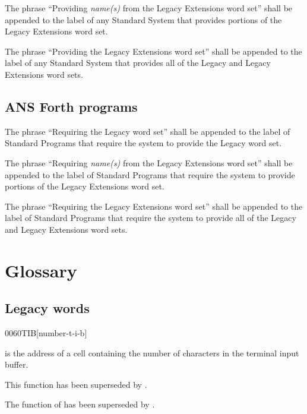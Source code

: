 The phrase ``Providing \emph{name(s)} from the Legacy Extensions
word set'' shall be appended to the label of any Standard System
that provides portions of the Legacy Extensions word set.

The phrase ``Providing the Legacy Extensions word set'' shall be
appended to the label of any Standard System that provides all of
the Legacy and Legacy Extensions word sets.

\subsection{ANS Forth programs} %

The phrase ``Requiring the Legacy word set'' shall be appended to
the label of Standard Programs that require the system to provide
the Legacy word set.

The phrase ``Requiring \emph{name(s)} from the Legacy Extensions
word set'' shall be appended to the label of Standard Programs that
require the system to provide portions of the Legacy Extensions
word set.

The phrase ``Requiring the Legacy Extensions word set'' shall be
appended to the label of Standard Programs that require the system
to provide all of the Legacy and Legacy Extensions word sets.


\section{Glossary} %

\subsection{Legacy words} %


\begin{worddef}[numTIB]{0060}{\num{}TIB}[number-t-i-b]
\item {}

	 is the address of a cell containing the number
	of characters in the terminal input buffer.

\note
	This function has been superseded by .

	\begin{rationale} %
		The function of  has been superseded by
		.
	\end{rationale}
\end{worddef}



